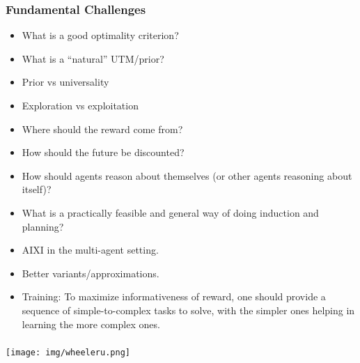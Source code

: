 \documentclass[UTF8,11pt,colorlinks,compress,openany]{beamer}%
\begin{document}
\begin{frame}\frametitle{Fundamental Challenges}
	\begin{itemize}
		\item What is a good optimality criterion?
		\item What is a ``natural'' UTM/prior?
		\item Prior vs universality
		\item Exploration vs exploitation
		\item Where should the reward come from?
		\item How should the future be discounted?
		\item How should agents reason about themselves (or other agents reasoning about itself)?
		\item What is a practically feasible and general way of doing induction and planning?
		\item AIXI in the multi-agent setting.
		\item Better variants/approximations.
		\item Training: To maximize informativeness of reward, one should provide a sequence of simple-to-complex tasks to solve, with the simpler ones helping in learning the more complex ones.
	\end{itemize}
\end{frame}

\begin{frame}\frametitle{}
\centerline{\Huge{} \texttt{[image: img/wheeleru.png]}}
\end{frame}



\end{document}
